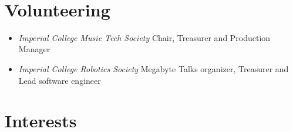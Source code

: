 \documentclass[10pt]{article} %
\begin{document}
\begin{minipage}[t]{0.44\textwidth}
\begin{tabular}{rl}

\end{tabular}\\[10pt]


\section{Volunteering}

\normalsize{
\begin{itemize}
\item \textit{Imperial College Music Tech Society} Chair, Treasurer and Production Manager
\item \textit{Imperial College Robotics Society} Megabyte Talks organizer, Treasurer and Lead software engineer
\end{itemize}
}


\section{Interests} 


\end{minipage}
\end{document}
